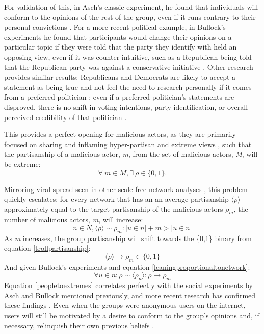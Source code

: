 \documentclass[NETN,manuscript]{stjour-new}
\begin{document}
 For validation of this, in Asch's classic experiment, he found that individuals will conform to the opinions of the rest of the group, even if it runs contrary to their personal convictions \citep{asch1956studies}. For a more recent political example, in Bullock's experiments he found that participants would change their opinions on a particular topic if they were told that the party they identify with held an opposing view, even if it was counter-intuitive, such as a Republican being told that the Republican party was against a conservative initiative \citep{bullock2007experiments}. Other research provides similar results: Republicans and Democrats are likely to accept a statement as being true and not feel the need to research personally if it comes from a preferred politician \citep{housholder2014facebook}; even if a preferred politician's statements are disproved, there is no shift in voting intentions, party identification, or overall perceived credibility of that politician \citep{swire2017processing}. 
 
This provides a perfect opening for malicious actors, as they are primarily focused on sharing and inflaming hyper-partisan and extreme views \citep{bastos2019brexit,hegelich2016social}, such that the partisanship of a malicious actor, \textit{m}, from the set of malicious actors, \textit{M}, will be extreme: 
\begin{equation}
\label{trollpartisanship}
\forall \ m \in M, \exists \ \rho \in \{0,1\}.
\end{equation}

Mirroring viral spread seen in other scale-free network analyses \citep{pastor2001epidemic,cohen2003efficient}, this problem quickly escalates: for every network that has an an average partisanship $\langle \rho \rangle$ approximately equal to the target partisanship of the malicious actors $\rho_m$, the number of malicious actors, \textit{m}, will increase:
\begin{equation}
\label{maliciousactorsincreasenetwork}
    n \in N, \langle \rho \rangle \sim \rho_m: |u \in n| + m > |u \in n|
\end{equation}
As \textit{m} increases, the group partisanship will shift towards the \{0,1\} binary from equation \ref{trollpartisanship}: 
\begin{equation}
\langle \rho \rangle \rightarrow \rho_m \in \{0,1\}
\end{equation} 
And given Bullock's experiments and equation \ref{leaningproportionaltonetwork}:
\begin{equation}
\label{peopletoextremes}
    \forall u \in n: \rho \sim \langle \rho_n \rangle: \rho \rightarrow \rho_m
\end{equation}
Equation \ref{peopletoextremes} correlates perfectly with the social experiments by Asch and Bullock mentioned previously, and more recent research has confirmed these findings \citep{colliander2019fake,edelson2011following}. Even when the groups were anonymous users on the internet, users will still be motivated by a desire to conform to the group's opinions and, if necessary, relinquish their own previous beliefs  \citep{williams2000cyberostracism,zhu2012switch,tsikerdekis2013effects,breitsohl2015groupthink,winter2015they,hamilton2017s}. 
\end{document}
